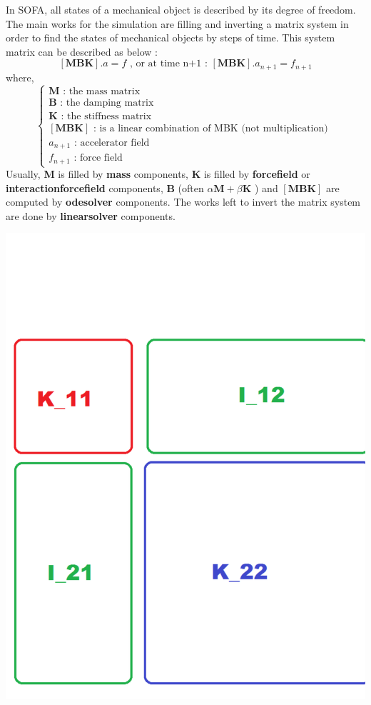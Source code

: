 In SOFA, all states of a mechanical object is described by its degree of freedom. The main works for the simulation are filling and inverting a matrix system in order to find the states of mechanical objects by steps of time. This system matrix can be described as below :
 \[
\left[ \textbf{MBK} \right].a=f \text{    ,  or at time n+1 :   }\left[ \textbf{MBK} \right].a_{n+1}=f_{n+1}
\]
where,
\[
\left\{ 
\begin{array}{l}
\textbf{M} \text { : the mass matrix   }  \\
\textbf{B} \text { : the damping matrix   }  \\
\textbf{K} \text { : the stiffness matrix   }  \\
\left[ \textbf{MBK} \right] \text {  : is a linear combination of MBK (not multiplication)   }  \\
a_{n+1} \text { : accelerator field} \\
f_{n+1} \text { : force field} 
\end{array}\right.
\]
 Usually, \textbf{M} is filled by \textbf{mass} components, \textbf{K} is filled by \textbf{forcefield} or \textbf{interactionforcefield} components, \textbf{B} (often $\alpha\textbf{M}+\beta\textbf{K}$ ) and $\left[ \textbf{MBK} \right]$ are computed by \textbf{odesolver} components. The works left to invert the matrix system are done by \textbf{linearsolver} components.
\begin{center}
\includegraphics[scale=0.3]{matrix_bloc.pdf}
\end{center}
